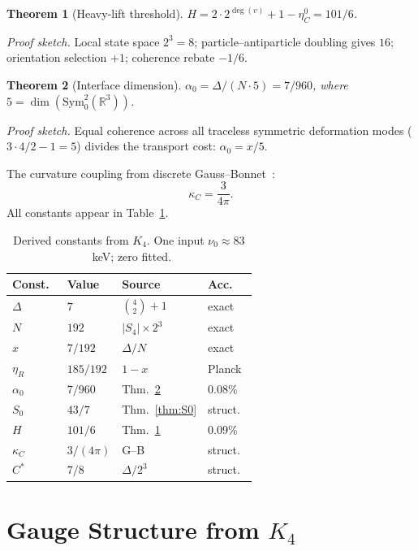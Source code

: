 \documentclass[11pt,twocolumn]{article}
\newtheorem{theorem}{Theorem}
\begin{document}
\begin{theorem}[Heavy-lift threshold]
\label{thm:H}
$H = 2\cdot 2^{\deg(v)}+1-\eta_C^0 = 101/6$.
\end{theorem}
\textit{Proof sketch.}
Local state space $2^3=8$; particle--antiparticle doubling gives $16$; orientation selection $+1$; coherence rebate $-1/6$.

\begin{theorem}[Interface dimension]
\label{thm:alpha}
$\alpha_0 = \Delta/(N\cdot 5)=7/960$, where $5=\dim(\mathrm{Sym}^2_0(\mathbb{R}^3))$.
\end{theorem}
\textit{Proof sketch.}
Equal coherence across all traceless symmetric deformation modes ($3\cdot 4/2-1=5$) divides the transport cost: $\alpha_0=x/5$.

The curvature coupling from discrete Gauss--Bonnet~\cite{hirani2003}:
\begin{equation}
\kappa_C = \frac{3}{4\pi}.
\label{eq:kappaC}
\end{equation}
All constants appear in Table~\ref{tab:constants}.

\begin{table}[t]
\centering
\caption{Derived constants from $K_4$.
One input $\nu_0\approx 83$~keV; zero fitted.}
\label{tab:constants}
\small
\begin{tabular}{@{}l@{\hskip 6pt}l@{\hskip 6pt}l@{\hskip 6pt}l@{}}
\toprule
Const.\ & Value & Source & Acc.\ \\
\midrule
$\Delta$ & $7$ & $\binom{4}{2}{+}1$ & exact \\
$N$ & $192$ & $|S_4|{\times}2^3$ & exact \\
$x$ & $7/192$ & $\Delta/N$ & exact \\
$\eta_R$ & $185/192$ & $1{-}x$ & Planck \\
$\alpha_0$ & $7/960$ & Thm.~\ref{thm:alpha} & 0.08\% \\
$S_0$ & $43/7$ & Thm.~\ref{thm:S0} & struct.\ \\
$H$ & $101/6$ & Thm.~\ref{thm:H} & 0.09\% \\
$\kappa_C$ & $3/(4\pi)$ & G--B & struct.\ \\
$C^*$ & $7/8$ & $\Delta/2^3$ & struct.\ \\
\bottomrule
\end{tabular}
\end{table}

\section{Gauge Structure from $K_4$}
\label{sec:gauge}
\end{document}
